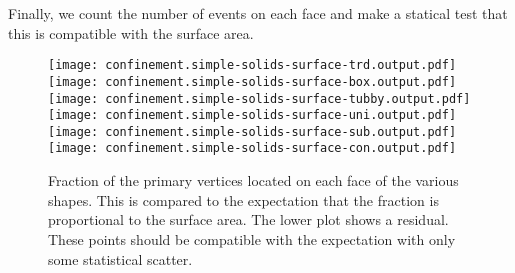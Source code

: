 Finally, we count the number of events on each face and make a statical test that this is compatible with the surface area.

\begin{figure}[h!]
    \centering
    \texttt{[image: confinement.simple-solids-surface-trd.output.pdf]}
    \texttt{[image: confinement.simple-solids-surface-box.output.pdf]}
    \texttt{[image: confinement.simple-solids-surface-tubby.output.pdf]}
    \texttt{[image: confinement.simple-solids-surface-uni.output.pdf]}
    \texttt{[image: confinement.simple-solids-surface-sub.output.pdf]}
    \texttt{[image: confinement.simple-solids-surface-con.output.pdf]}

    \caption{Fraction of the primary vertices located on each face of the various shapes. This is compared to the expectation
    that the fraction is proportional to the surface area. The lower plot shows a residual. These points should be compatible with the expectation with only some statistical scatter.
        }
\end{figure}
